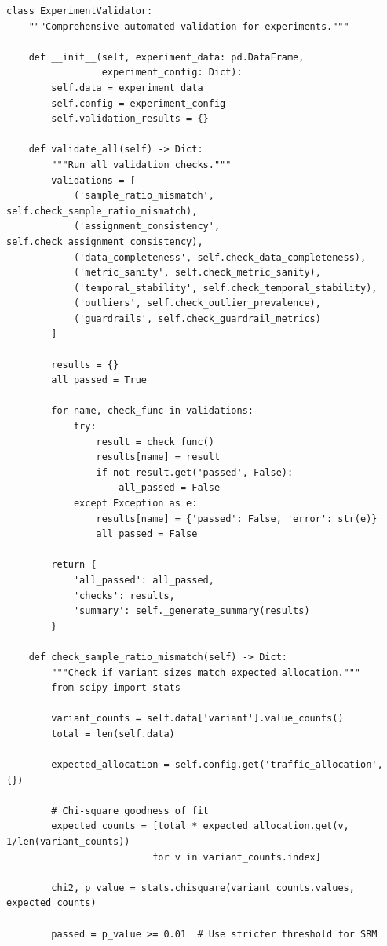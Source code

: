 \lstset{language=Python, caption=Automated Validation Framework}
\begin{lstlisting}
class ExperimentValidator:
    """Comprehensive automated validation for experiments."""

    def __init__(self, experiment_data: pd.DataFrame,
                 experiment_config: Dict):
        self.data = experiment_data
        self.config = experiment_config
        self.validation_results = {}

    def validate_all(self) -> Dict:
        """Run all validation checks."""
        validations = [
            ('sample_ratio_mismatch', self.check_sample_ratio_mismatch),
            ('assignment_consistency', self.check_assignment_consistency),
            ('data_completeness', self.check_data_completeness),
            ('metric_sanity', self.check_metric_sanity),
            ('temporal_stability', self.check_temporal_stability),
            ('outliers', self.check_outlier_prevalence),
            ('guardrails', self.check_guardrail_metrics)
        ]

        results = {}
        all_passed = True

        for name, check_func in validations:
            try:
                result = check_func()
                results[name] = result
                if not result.get('passed', False):
                    all_passed = False
            except Exception as e:
                results[name] = {'passed': False, 'error': str(e)}
                all_passed = False

        return {
            'all_passed': all_passed,
            'checks': results,
            'summary': self._generate_summary(results)
        }

    def check_sample_ratio_mismatch(self) -> Dict:
        """Check if variant sizes match expected allocation."""
        from scipy import stats

        variant_counts = self.data['variant'].value_counts()
        total = len(self.data)

        expected_allocation = self.config.get('traffic_allocation', {})

        # Chi-square goodness of fit
        expected_counts = [total * expected_allocation.get(v, 1/len(variant_counts))
                          for v in variant_counts.index]

        chi2, p_value = stats.chisquare(variant_counts.values, expected_counts)

        passed = p_value >= 0.01  # Use stricter threshold for SRM


\end{lstlisting}
